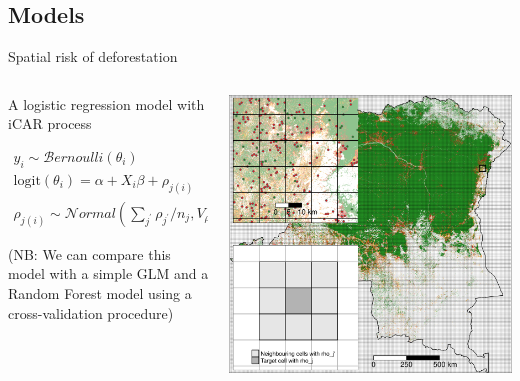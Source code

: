 \documentclass[10pt,table,dvipsnames,compress]{beamer}
\begin{document}
\subsection{Models}
\label{sec:orgb4a935e}
\begin{frame}[label={sec:orga07a282}]{Spatial risk of deforestation}
\begin{columns}
\begin{column}{0.5\columnwidth}
A logistic regression model with iCAR process

\begin{equation*}
\begin{split}
  y_i \sim \mathcal{B}ernoulli(\theta_i)\\
  \text{logit}(\theta_i) = \alpha + X_i \beta + \rho_{j(i)}\\
  \rho_{j(i)} \sim \mathcal{N}ormal(\sum_{j^{\prime}} \rho_{j^{\prime}} / n_j,V_{\rho} / n_j)
\end{split}
\end{equation*}

\footnotesize (NB: We can compare this model with a simple GLM and a Random
Forest model using a cross-validation procedure)
\end{column}

\begin{column}{0.5\columnwidth}
\includegraphics[width=\textwidth]{figs/sm/grid}

\end{column}
\end{columns}
\end{frame}
\end{document}
